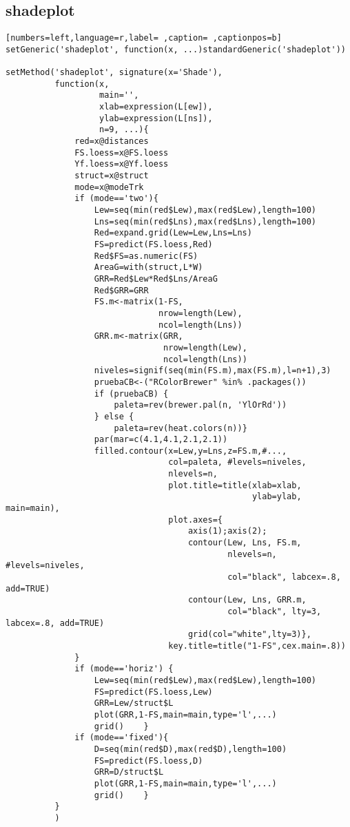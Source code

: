\subsection{shadeplot}
\label{sec:org9039dee}
\begin{lstlisting}[numbers=left,language=r,label= ,caption= ,captionpos=b]
setGeneric('shadeplot', function(x, ...)standardGeneric('shadeplot'))

setMethod('shadeplot', signature(x='Shade'),
          function(x,
                   main='',
                   xlab=expression(L[ew]),
                   ylab=expression(L[ns]),
                   n=9, ...){
              red=x@distances
              FS.loess=x@FS.loess
              Yf.loess=x@Yf.loess
              struct=x@struct
              mode=x@modeTrk
              if (mode=='two'){
                  Lew=seq(min(red$Lew),max(red$Lew),length=100)
                  Lns=seq(min(red$Lns),max(red$Lns),length=100)
                  Red=expand.grid(Lew=Lew,Lns=Lns)
                  FS=predict(FS.loess,Red)
                  Red$FS=as.numeric(FS)
                  AreaG=with(struct,L*W)
                  GRR=Red$Lew*Red$Lns/AreaG
                  Red$GRR=GRR
                  FS.m<-matrix(1-FS,
                               nrow=length(Lew),
                               ncol=length(Lns))
                  GRR.m<-matrix(GRR,
                                nrow=length(Lew),
                                ncol=length(Lns))
                  niveles=signif(seq(min(FS.m),max(FS.m),l=n+1),3)
                  pruebaCB<-("RColorBrewer" %in% .packages())
                  if (pruebaCB) {
                      paleta=rev(brewer.pal(n, 'YlOrRd'))
                  } else {
                      paleta=rev(heat.colors(n))}
                  par(mar=c(4.1,4.1,2.1,2.1)) 
                  filled.contour(x=Lew,y=Lns,z=FS.m,#...,
                                 col=paleta, #levels=niveles,
                                 nlevels=n,
                                 plot.title=title(xlab=xlab,
                                                  ylab=ylab, main=main),
                                 plot.axes={
                                     axis(1);axis(2);
                                     contour(Lew, Lns, FS.m,
                                             nlevels=n, #levels=niveles,
                                             col="black", labcex=.8,  add=TRUE)
                                     contour(Lew, Lns, GRR.m,
                                             col="black", lty=3, labcex=.8, add=TRUE)
                                     grid(col="white",lty=3)},
                                 key.title=title("1-FS",cex.main=.8))
              }
              if (mode=='horiz') {
                  Lew=seq(min(red$Lew),max(red$Lew),length=100)
                  FS=predict(FS.loess,Lew)
                  GRR=Lew/struct$L
                  plot(GRR,1-FS,main=main,type='l',...)
                  grid()    }
              if (mode=='fixed'){
                  D=seq(min(red$D),max(red$D),length=100)
                  FS=predict(FS.loess,D)
                  GRR=D/struct$L
                  plot(GRR,1-FS,main=main,type='l',...)
                  grid()    }
          }
          )
\end{lstlisting}
